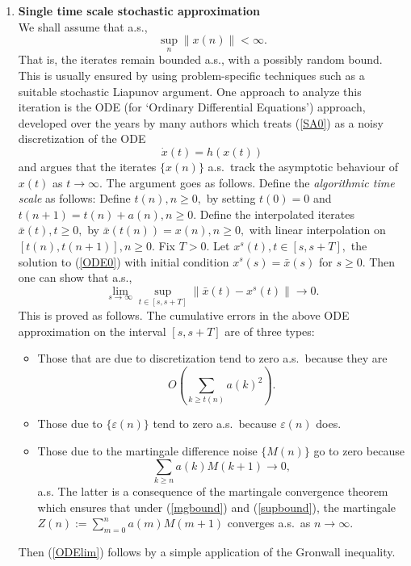\documentclass[12pt]{article}
\numberwithin{equation}{section}
\newcommand{\1}{\textbf{1}}
\begin{document}
\begin{enumerate}
\item \textbf{Single time scale stochastic approximation}\\

We shall assume that a.s.,
\begin{equation}
\sup_n\|x(n)\| < \infty. \label{supbound}
\end{equation}
That is, the iterates remain bounded a.s., with a possibly random bound. This is usually ensured  by using problem-specific techniques such as a suitable stochastic Liapunov argument. 
One approach to analyze this iteration is the ODE  (for `Ordinary Differential Equations') approach, developed over the years by many authors \cite{Benaim, Der, Ljung, Metivier}  which treats (\ref{SA0}) as a noisy discretization of the ODE
\begin{equation}
\dot{x}(t) = h(x(t)) \label{ODE0}
\end{equation}
and argues that the iterates $\{x(n)\}$ a.s.\ track the asymptotic behaviour of $x(t)$ as $t\to\infty$. The argument goes as follows. Define the \textit{algorithmic time scale} as follows: Define $t(n), n \geq 0,$ by setting $t(0) = 0$ and $t(n+1) = t(n) + a(n), n \geq 0$. Define the interpolated iterates $\bar{x}(t), t \geq 0,$ by $\bar{x}(t(n)) = x(n), n \geq 0,$ with linear interpolation on $[t(n), t(n+1)], n \geq 0$. Fix $T > 0$. Let $x^s(t), t \in [s, s + T],$ the solution to (\ref{ODE0}) with initial condition $x^s(s) = \bar{x}(s)$ for $s \geq 0$. Then one can show that a.s.,
\begin{equation}
\lim_{s\to\infty}\sup_{t \in [s,s+T]}\|\bar{x}(t) - x^s(t)\| \to 0. \label{ODElim} 
\end{equation}
This is proved as follows. The cumulative errors in the above ODE approximation on the interval $[s,s+T]$ are of three types:
\begin{itemize}
\item  Those that are due to discretization  tend to zero a.s.\ because they are 
$$O\left(\sum_{k \geq t(n)}a(k)^2\right).$$ 

\item Those due to $\{\varepsilon(n)\}$ tend to zero a.s.\ because $\varepsilon(n)$ does.

\item Those due to the martingale difference noise $\{M(n)\}$ go to zero because 
\begin{equation}\label{vanishingtail}
\sum_{k\geq n}a(k)M(k+1) \to 0,
\end{equation}
a.s. The latter is a consequence of the martingale convergence theorem which ensures that under (\ref{mgbound}) and (\ref{supbound}), the martingale $Z(n) := \sum_{m=0}^na(m)M(m+1)$ converges a.s.\ as $n\to\infty$. 
\end{itemize}
Then (\ref{ODElim}) follows by a simple application of the Gronwall inequality.


\end{enumerate}
\end{document}
